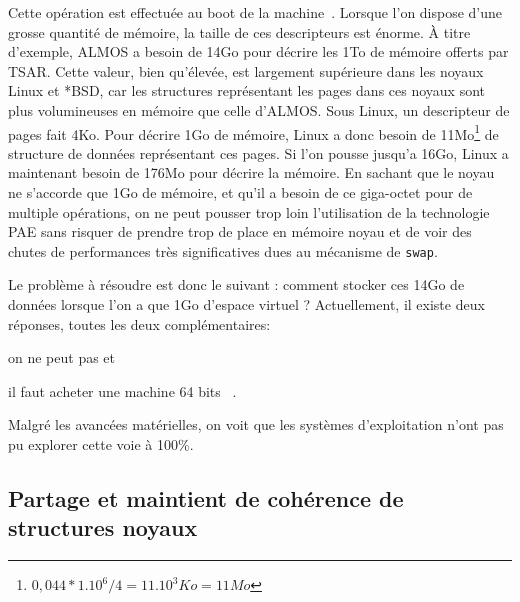      Cette opération est effectuée au boot de la machine~\citep{cranor1999uvm,
        gorman2004understanding, russinovich2012windows,
        dillon2000design}. Lorsque l’on dispose d’une grosse quantité de
      mémoire, la taille de ces descripteurs est énorme. À titre d’exemple,
      ALMOS a besoin de 14Go pour décrire les 1To de mémoire offerts par
      TSAR. Cette valeur, bien qu’élevée, est largement supérieure dans les
      noyaux Linux et *BSD, car les structures représentant les pages
      dans ces noyaux sont plus volumineuses en mémoire que celle d’ALMOS. Sous
      Linux, un descripteur de pages fait 4Ko. Pour décrire 1Go de mémoire,
      Linux a donc besoin de 11Mo\footnote{$0,044*1.10^6/4 = 11.10^3Ko = 11Mo$}
      de structure de données représentant ces pages. Si l'on pousse jusqu'a
      16Go, Linux a maintenant besoin de 176Mo pour décrire la mémoire. En
      sachant que le noyau ne s'accorde que 1Go de mémoire, et qu'il a besoin de
      ce giga-octet pour de multiple opérations, on ne peut pousser trop loin
      l'utilisation de la technologie PAE sans risquer de prendre trop de place
      en mémoire noyau et de voir des chutes de performances très significatives
      dues au mécanisme de \texttt{swap}.

      Le problème à résoudre est donc le suivant : comment stocker ces 14Go de
      données lorsque l’on a que 1Go d’espace virtuel ?  Actuellement, il existe
      deux réponses, toutes les deux complémentaires: \benumline \item on ne
      peut pas et \item il faut acheter une machine 64
      bits~\citep{gorman2004understanding} \eenumline.

      Malgré les avancées matérielles, on voit que les systèmes d'exploitation
      n'ont pas pu explorer cette voie à 100\%.


  \subsection{Partage et maintient de cohérence de structures noyaux}
  \label{sec:consistency}
  




